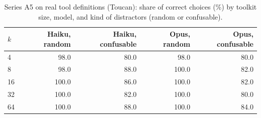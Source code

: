 \begin{table}[!ht]\centering\caption{Series A5 on real tool definitions (Toucan): share of correct choices (\%) by toolkit size, model, and kind of distractors (random or confusable).}\label{tab:a5real}\scriptsize\begin{tabular}{lrrrr}\toprule $k$ & Haiku, random & Haiku, confusable & Opus, random & Opus, confusable \\ \midrule
4 & 98.0 & 80.0 & 98.0 & 80.0 \\
8 & 98.0 & 88.0 & 100.0 & 82.0 \\
16 & 100.0 & 86.0 & 100.0 & 82.0 \\
32 & 100.0 & 82.0 & 100.0 & 80.0 \\
64 & 100.0 & 88.0 & 100.0 & 84.0 \\
\bottomrule\end{tabular}\end{table}
